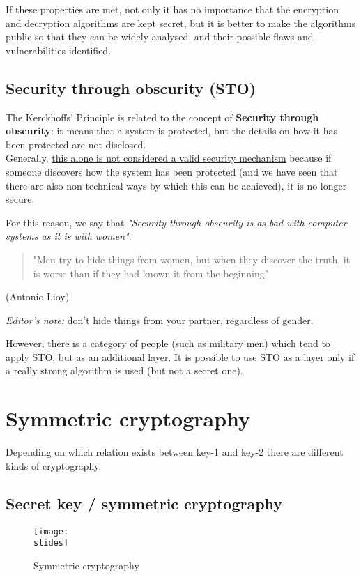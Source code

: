 If these properties are met,
not only it has no importance that the encryption and decryption algorithms are kept secret, but it is better to
make the algorithms public so that they can be widely analysed, and their possible flaws and vulnerabilities identified.

\subsection{Security through obscurity (STO)}
The Kerckhoffs' Principle is related to the concept of \textbf{Security through obscurity}: it means that a system is protected, but the details on how it has been protected are not disclosed.\\
Generally, \ul{this alone is not considered a valid security mechanism} because if someone discovers how the system has been protected (and we have seen that there are also non-technical ways by which this can be achieved), it is no longer secure.

For this reason, we say that \emph{"Security through obscurity is as bad with computer systems as it is with women"}.
\begin{quote}
    "Men try to hide things from women, but when they discover the truth, it is worse than if they had known it from the beginning"
\end{quote}
\begin{flushright}
    (Antonio Lioy)
\end{flushright}
\emph{Editor's note:} don't hide things from your partner, regardless of gender.


However, there is a category of people (such as military men) which tend to apply STO, but as an \ul{additional
    layer}. It is possible to use STO as a layer only if a really strong algorithm is used (but not a secret one).



\section{Symmetric cryptography}
Depending on which relation exists between key-1 and key-2 there are different kinds of cryptography.

\subsection{Secret key / symmetric cryptography}
\begin{figure}[h]
    \centering
    \texttt{[image: \\slides]}
    \caption{Symmetric cryptography}
    \label{fig:cap2slide6}
\end{figure}

